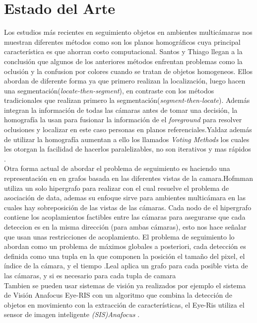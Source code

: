 \section{Estado del Arte}
Los estudios m\'as recientes en seguimiento objetos en ambientes multic\'amaras nos muestran diferentes m\'etodos como son los planos homogr\'aficos cuya principal caracter\'istica es que ahorran costo computacional. Santos y Thiago llegan a la conclusi\'on que algunos de los anteriores m\'etodos enfrentan problemas como la oclusi\'on y la confusion por colores cuando se tratan de objetos homogeneos. Ellos abordan de diferente forma ya que primero realizan la localizaci\'on, luego hacen una segmentaci\'on(\textit{locate-then-segment}), en contraste con los m\'etodos tradicionales que realizan primero la segmentaci\'on(\textit{segment-then-locate}). Adem\'as integran la informaci\'on de todas las c\'amaras antes de tomar una decisi\'on, la homograf\'ia la usan para fusionar la informaci\'on de el \textit{foreground} para resolver oclusiones y localizar en este caso personas en planos referenciales\cite{Santos_art}.Yaldaz adem\'as de  utilizar la homograf\'ia aumentan a ello  los llamados \textit{Voting Methods} los cuales les otorgan la facilidad de hacerlos paralelizables, no son iterativos y mas r\'apidos \cite{yaldaz_mot}. \\
Otra forma actual de abordar el problema de seguimiento es haciendo una representaci\'on en en grafos basada en las diferentes vistas de la camara.Hofmman utiliza un solo hipergrafo para realizar con el cual resuelve el problema de asociaci\'on de data, ademas su enfoque sirve para ambientes multic\'amara en las cuales hay sobreposici\'on de las vistas de las c\'amaras. Cada nodo de el hipergrafo contiene los acoplamientos factibles entre las c\'amaras para asegurarse que cada deteccion es en la misma direcci\'on (para ambas c\'amaras), esto nos hace se\~nalar que usan unas restricciones de acoplamiento. El problema de seguimiento lo abordan como un problema de m\'aximos globales a posteriori, cada detecci\'on es definida como una tupla en la que componen la posici\'on el tama\~no del pixel, el \'indice de la c\'amara, y el tiempo \cite{Hofman_art}.Leal aplica un grafo para cada posible vista de las c\'amaras, y si es necesario para cada tupla de camara\cite{Leal_art}\\
Tambien se pueden usar sistemas de visi\'on ya realizados por ejemplo el sistema de Visi\'on Anafocus Eye-RIS con un algoritmo  que combina la detecci\'on de objetos en movimiento con la extracci\'on de caracter\'isticas, el Eye-Ris utiliza el sensor de imagen inteligente \textit{(SIS)Anafocus} \cite{karabiber_mot}.\\
